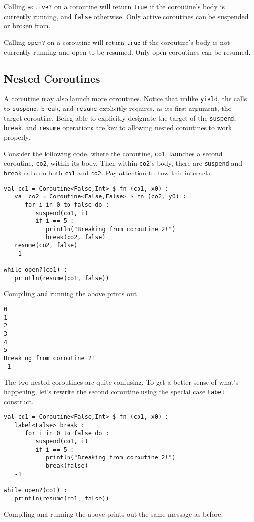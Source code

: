 \documentclass[10pt,oneside]{book}
\begin{document}
Calling \texttt{\frenchspacing active?} on a coroutine will return \texttt{\frenchspacing true} if the coroutine's body is currently running, and \texttt{\frenchspacing false} otherwise. Only active coroutines can be suspended or broken from.

Calling \texttt{\frenchspacing open?} on a coroutine will return \texttt{\frenchspacing true} if the coroutine's body is not currently running and open to be resumed. Only open coroutines can be resumed.


\subsection*{Nested Coroutines}
A coroutine may also launch more coroutines. Notice that unlike \texttt{\frenchspacing yield}, the calls to \texttt{\frenchspacing suspend}, \texttt{\frenchspacing break}, and \texttt{\frenchspacing resume} explicitly requires, as its first argument, the target coroutine. Being able to explicitly designate the target of the \texttt{\frenchspacing suspend}, \texttt{\frenchspacing break}, and \texttt{\frenchspacing resume} operations are key to allowing nested coroutines to work properly.

Consider the following code, where the coroutine, \texttt{\frenchspacing co1}, launches a second coroutine, \texttt{\frenchspacing co2}, within its body. Then within \texttt{\frenchspacing co2}'s body, there are \texttt{\frenchspacing suspend} and \texttt{\frenchspacing break} calls on both \texttt{\frenchspacing co1} and \texttt{\frenchspacing co2}. Pay attention to how this interacts.
\begin{lstlisting}
val co1 = Coroutine<False,Int> $ fn (co1, x0) :
   val co2 = Coroutine<False,False> $ fn (co2, y0) :
      for i in 0 to false do :
         suspend(co1, i)
         if i == 5 :
            println("Breaking from coroutine 2!")
            break(co2, false)
   resume(co2, false)
   -1

while open?(co1) :
   println(resume(co1, false))
\end{lstlisting}
Compiling and running the above prints out
\begin{lstlisting}
0
1
2
3
4
5
Breaking from coroutine 2!
-1
\end{lstlisting}

The two nested coroutines are quite confusing. To get a better sense of what's happening, let's rewrite the second coroutine using the special case \texttt{\frenchspacing label} construct.
\begin{lstlisting}
val co1 = Coroutine<False,Int> $ fn (co1, x0) :
   label<False> break :
      for i in 0 to false do :
         suspend(co1, i)
         if i == 5 :
            println("Breaking from coroutine 2!")
            break(false)
   -1

while open?(co1) :
   println(resume(co1, false))
\end{lstlisting}
Compiling and running the above prints out the same message as before.
\end{document}
